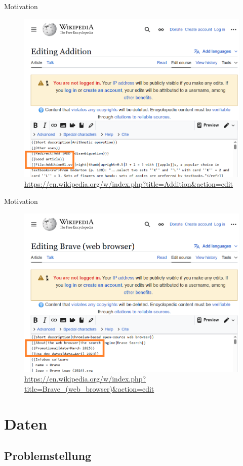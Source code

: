 \documentclass[aspectratio=169]{beamer} %
\begin{document}
\begin{frame}{Motivation}
    \begin{figure}
        \centering
        \includegraphics[width=0.6\linewidth]{figures/wp-screenshot-good-source.png}
        \caption{\url{https://en.wikipedia.org/w/index.php?title=Addition&action=edit}}
    \end{figure}
\end{frame}

\begin{frame}{Motivation}
    \begin{figure}
        \centering
        \includegraphics[width=0.6\linewidth]{figures/wp-screenshot-promo-source.png}
        \caption{\url{https://en.wikipedia.org/w/index.php?title=Brave_(web_browser)&action=edit}}
    \end{figure}
\end{frame}

\section{Daten}

\subsection{Problemstellung}
\end{document}

